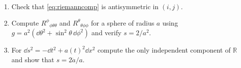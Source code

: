 \begin{exercises}
\begin{enumerate}[nosep]
\item Check that \eqref{eq:riemanncomp} is antisymmetric in $(i,j)$.
\item Compute $R^\phi{}_{\phi\theta\theta}$ and $R^\theta{}_{\theta\phi\phi}$ for a sphere of radius $a$ using $g=a^2(\dd\theta^2+\sin^2\theta\,\dd\phi^2)$ and verify $s=2/a^2$.
\item For $\dd s^2=-\dd t^2+a(t)^2\dd x^2$ compute the only independent component of $\mathbb R$ and show that $s=2\ddot a/a$.
\end{enumerate}
\end{exercises}
